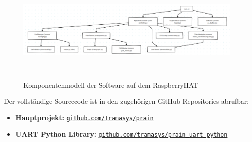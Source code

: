 \documentclass[main.tex]{subfiles} %
\begin{document}
\begin{figure}[H]
    \centering
    \includegraphics[width = 0.9\linewidth]{./Informatik_subfiles/fig_Informatik/diagram_not_fucked.png}
    \caption{Komponentenmodell der Software auf dem RaspberryHAT}~\label{fig:Komponentenmodell}
\end{figure}

Der vollständige Sourcecode ist in den zugehörigen 
GitHub-Repositories abrufbar:
\begin{itemize}\setlength\itemsep{0.3em}
  \item \textbf{Hauptprojekt:} \href{https://github.com/tramasys/prain}{\texttt{github.com/tramasys/prain}}
  \item \textbf{UART Python Library:} \href{https://github.com/tramasys/prain_uart_python}{\texttt{github.com/tramasys/prain\_uart\_python}}
\end{itemize}



\newpage


\newpage


\newpage


\newpage
\end{document}

